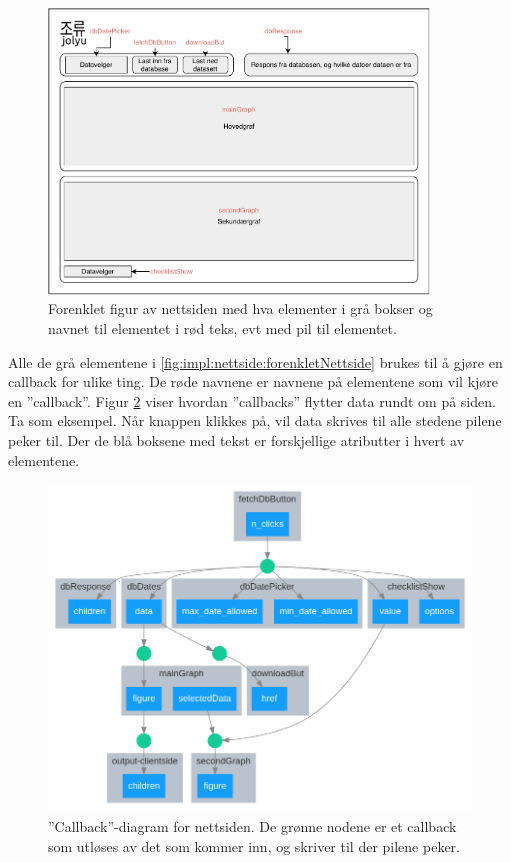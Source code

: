 \begin{figure}[!htbp]
    \centering
    \includegraphics[width=0.9\textwidth]{implementering/nettside/NettsideEnkel.pdf}
    \caption{Forenklet figur av nettsiden med hva elementer i grå bokser og navnet til elementet i rød teks, evt med pil til elementet.}
    \label{fig:impl:nettside:forenkletNettside}
\end{figure}

Alle de grå elementene i \autoref{fig:impl:nettside:forenkletNettside} brukes til å gjøre en callback for ulike ting. 
De røde navnene er navnene på elementene som vil kjøre en ''callback''.
Figur \ref{fig:impl:nettside:callback} viser hvordan ''callbacks'' flytter data rundt om på siden. 
Ta  som eksempel. 
Når knappen klikkes på, vil data skrives til alle stedene pilene peker til. 
Der de blå boksene med tekst er forskjellige atributter i hvert av elementene.


\begin{figure}[!htbp]
    \centering
    \includegraphics[width=.9\textwidth]{implementering/nettside/callbacks.png}
    \caption{''Callback''-diagram for nettsiden. De grønne nodene er et callback som utløses av det som kommer inn, og skriver til der pilene peker.}
    \label{fig:impl:nettside:callback}
\end{figure}

